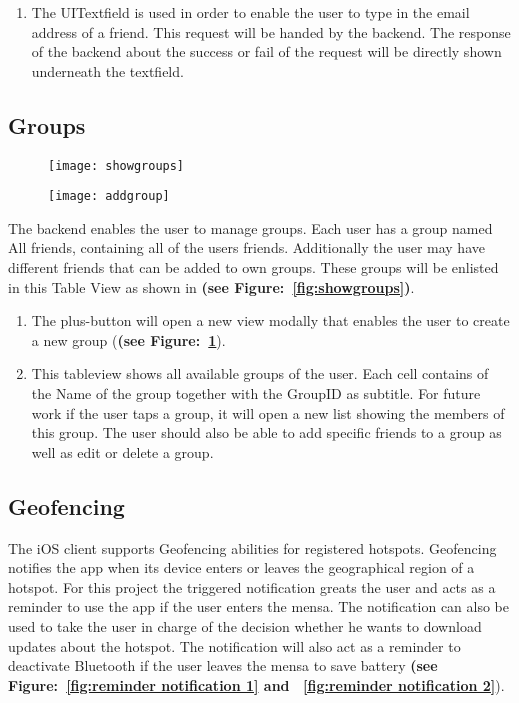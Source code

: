 \begin{enumerate}
\item The UITextfield is used in order to enable the user to type in the email address of a friend. This request will be handed by the backend. The response of the backend about the success or fail of the request will be directly shown underneath the textfield.
\end{enumerate}

\subsection{Groups}

\begin{figure}
\centering
\begin{minipage}{.5\textwidth}
  \centering
  \texttt{[image: showgroups]}
  \label{fig:showgroups}
\end{minipage}%
\begin{minipage}{.5\textwidth}
  \centering
  \texttt{[image: addgroup]}
  \label{fig:addgroup}
\end{minipage}
\end{figure}

The backend enables the user to manage groups. Each user has a group named All friends, containing all of the users friends. Additionally the user may have different friends that can be added to own groups. These groups will be enlisted in this Table View as shown in \textbf{(see Figure:~\ref{fig:showgroups})}.

\begin{enumerate}
 \item The plus-button will open a new view modally that enables the user to create a new group (\textbf{(see Figure:~\ref{fig:addgroup}}).
 \item This tableview shows all available groups of the user. Each cell contains of the Name of the group together with the GroupID as subtitle. For future work if the user taps a group, it will open a new list showing the members of this group. The user should also be able to add specific friends to a group as well as edit or delete a group.
\end{enumerate}

\subsection{Geofencing}
The iOS client supports Geofencing abilities for registered hotspots. Geofencing notifies the app when its device enters or leaves the geographical region of a hotspot. For this project the triggered notification greats the user and acts as a reminder to use the app if the user enters the mensa. The notification can also be used to take the user in charge of the decision whether he wants to download updates about the hotspot. The notification will also act as a reminder to deactivate Bluetooth if the user leaves the mensa to save battery \textbf{(see Figure:~\ref{fig:reminder notification 1} and ~\ref{fig:reminder notification 2}}).

